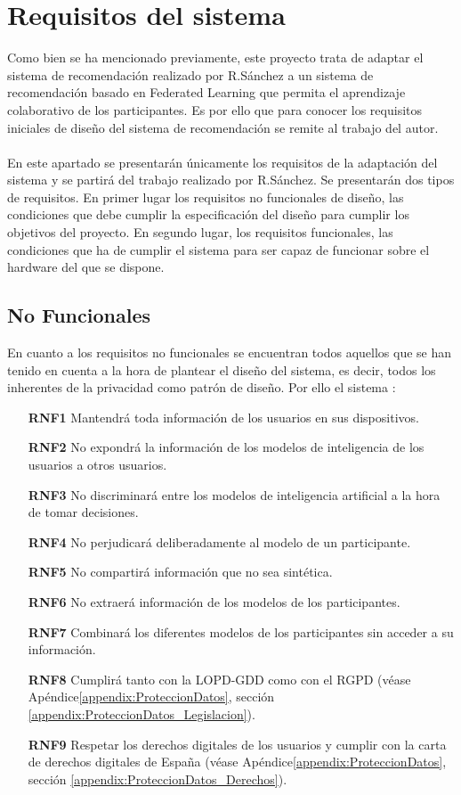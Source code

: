 \section{Requisitos del sistema}
Como bien se ha mencionado previamente, este proyecto trata de adaptar el sistema de recomendación realizado por R.Sánchez \autocite{sanchez-corcueraPersuasionbasedRecommenderSystem2020} a un sistema de recomendación basado en Federated Learning que permita el aprendizaje colaborativo de los participantes. Es por ello que para conocer los requisitos iniciales de diseño del sistema de recomendación se remite al trabajo del autor.
\\ \\
En este apartado se presentarán únicamente los requisitos de la adaptación del sistema y se partirá del trabajo realizado por R.Sánchez. Se presentarán dos tipos de requisitos. En primer lugar los requisitos no funcionales de diseño, las condiciones que debe cumplir la especificación del diseño para cumplir los objetivos del proyecto. En segundo lugar, los requisitos funcionales, las condiciones que ha de cumplir el sistema para ser capaz de funcionar sobre el hardware del que se dispone.

\subsection{No Funcionales}
En cuanto a los requisitos no funcionales se encuentran todos aquellos que se han tenido en cuenta a la hora de plantear el diseño del sistema, es decir, todos los inherentes de la privacidad como patrón de diseño. Por ello el sistema :
\begin{itemize}
    \item [\textbf{RNF1}] Mantendrá toda información de los usuarios en sus dispositivos.
    \item [\textbf{RNF2}] No expondrá la información de los modelos de inteligencia de los usuarios a otros usuarios.
    \item [\textbf{RNF3}] No discriminará entre los modelos de inteligencia artificial a la hora de tomar decisiones.
    \item [\textbf{RNF4}] No perjudicará deliberadamente al modelo de un participante.
    \item [\textbf{RNF5}] No compartirá información que no sea sintética.
    \item [\textbf{RNF6}] No extraerá información de los modelos de los participantes.
    \item [\textbf{RNF7}] Combinará los diferentes modelos de los participantes sin acceder a su información.
    \item [\textbf{RNF8}] Cumplirá tanto con la LOPD-GDD como con el RGPD (véase Apéndice\ref{appendix:ProteccionDatos}, sección \ref{appendix:ProteccionDatos_Legislacion}).
    \item [\textbf{RNF9}] Respetar los derechos digitales de los usuarios y cumplir con la carta de derechos digitales de España (véase Apéndice\ref{appendix:ProteccionDatos}, sección \ref{appendix:ProteccionDatos_Derechos}).
\end{itemize}
